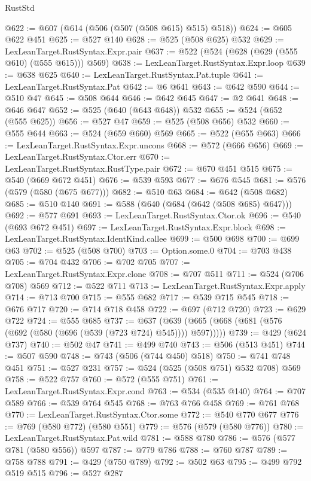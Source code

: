 \begin{lexlean}{RustStd}
\begin{coremodule}
@622 := @607 (@614 (@506 (@507 (@508 @615) @515) @518))
@624 := @605 @622 @451
@625 := @527 @140
@628 := @525 (@508 @625) @532
@629 := LexLeanTarget.RustSyntax.Expr.pair
@637 := @522 (@524 (@628 (@629 (@555 @610) (@555 @615))) @569)
@638 := LexLeanTarget.RustSyntax.Expr.loop
@639 := @638 @625
@640 := LexLeanTarget.RustSyntax.Pat.tuple
@641 := LexLeanTarget.RustSyntax.Pat
@642 := @6 @641
@643 := @642 @590
@644 := @510 @47
@645 := @508 @644
@646 := @642 @645
@647 := @2 @641
@648 := @646 @647
@652 := @525 (@640 (@643 @648)) @532
@655 := @524 (@652 (@555 @625))
@656 := @527 @47
@659 := @525 (@508 @656) @532
@660 := @555 @644
@663 := @524 (@659 @660) @569
@665 := @522 (@655 @663)
@666 := LexLeanTarget.RustSyntax.Expr.uncons
@668 := @572 (@666 @656)
@669 := LexLeanTarget.RustSyntax.Ctor.err
@670 := LexLeanTarget.RustSyntax.RustType.pair
@672 := @670 @451 @515
@675 := @540 (@669 @672 @451)
@676 := @539 @593
@677 := @676 @545
@681 := @576 (@579 (@580 (@675 @677)))
@682 := @510 @63
@684 := @642 (@508 @682)
@685 := @510 @140
@691 := @588 (@640 (@684 (@642 (@508 @685) @647)))
@692 := @577 @691
@693 := LexLeanTarget.RustSyntax.Ctor.ok
@696 := @540 (@693 @672 @451)
@697 := LexLeanTarget.RustSyntax.Expr.block
@698 := LexLeanTarget.RustSyntax.IdentKind.callee
@699 := @500 @698
@700 := @699 @63
@702 := @525 (@508 @700)
@703 := Option.some.{0}
@704 := @703 @438
@705 := @704 @432
@706 := @702 @705
@707 := LexLeanTarget.RustSyntax.Expr.clone
@708 := @707 @511
@711 := @524 (@706 @708) @569
@712 := @522 @711
@713 := LexLeanTarget.RustSyntax.Expr.apply
@714 := @713 @700
@715 := @555 @682
@717 := @539 @715 @545
@718 := @676 @717
@720 := @714 @718 @458
@722 := @697 (@712 @720)
@723 := @629 @722
@724 := @555 @685
@737 := @637 (@639 (@665 (@668 (@681 (@576 (@692 (@580 (@696 (@539 (@723 @724) @545)))) @597)))))
@739 := @429 (@624 @737)
@740 := @502 @47
@741 := @499 @740
@743 := @506 (@513 @451)
@744 := @507 @590
@748 := @743 (@506 (@744 @450) @518)
@750 := @741 @748 @451
@751 := @527 @231
@757 := @524 (@525 (@508 @751) @532 @708) @569
@758 := @522 @757
@760 := @572 (@555 @751)
@761 := LexLeanTarget.RustSyntax.Expr.cond
@763 := @534 (@535 @140)
@764 := @707 @589
@766 := @539 @764 @545
@768 := @763 @766 @458
@769 := @761 @768
@770 := LexLeanTarget.RustSyntax.Ctor.some
@772 := @540 @770 @677
@776 := @769 (@580 @772) (@580 @551)
@779 := @576 (@579 (@580 @776))
@780 := LexLeanTarget.RustSyntax.Pat.wild
@781 := @588 @780
@786 := @576 (@577 @781 (@580 @556)) @597
@787 := @779 @786
@788 := @760 @787
@789 := @758 @788
@791 := @429 (@750 @789)
@792 := @502 @63
@795 := @499 @792 @519 @515
@796 := @527 @287

\end{coremodule}
\end{lexlean}

